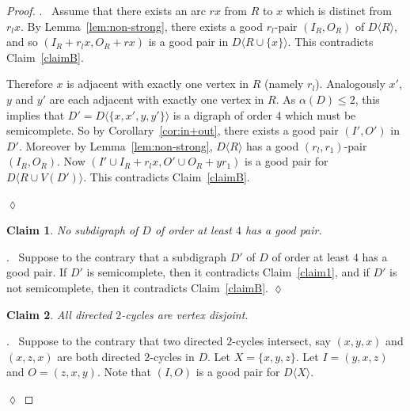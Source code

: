 \documentclass{article}
\newtheorem{claim}{Claim}[theorem]
\theoremstyle{definition}
\newcommand{\induce}[2]{#1\langle #2 \rangle}
\newcommand{\2}{\vspace{0.2cm}}
\newenvironment{subproof}{\par\noindent {\it Proof}.\ }{\hfill$\lozenge$\par\vspace{11pt}}
\begin{document}
\begin{proof}
\begin{subproof}
Assume that there exists an arc $r x$ from $R$ to $x$ which is
distinct from $r_l x$.  By Lemma~\ref{lem:non-strong}, there exists a
good $r_l$-pair $(I_R,O_R)$ of $\induce{D}{R}$, and so $(I_R+r_lx,
O_R+rx)$ is a good pair in $\induce{D}{R \cup \{x\}}$. This
contradicts Claim~\ref{claimB}.

Therefore $x$ is adjacent with exactly one vertex in $R$ (namely
$r_l$).  Analogously $x'$, $y$ and $y'$ are each adjacent with exactly
one vertex in $R$.  As $\alpha(D)\leq 2$, this implies that $D' = \induce{D}{\{x,x',y,y'\}}$
is a digraph of order $4$ which must be  semicomplete. So by
  Corollary~\ref{cor:in+out}, there exists a good pair $(I',O')$ in
  $D'$. Moreover by Lemma~\ref{lem:non-strong}, $\induce{D}{R}$ has a
  good $(r_l,r_1)$-pair $(I_R,O_R)$.  Now $(I'
  \cup I_R+ r_l x, O' \cup O_R + y r_1)$ is a
  good pair for $\induce{D}{R \cup V(D')}$. This contradicts
  Claim~\ref{claimB}.
%



\end{subproof}


\begin{claim}\label{claimC}
No subdigraph of $D$ of order at least $4$ has a good pair.
\end{claim}
\begin{subproof}
Suppose to the contrary that a subdigraph $D'$ of $D$ of order at
least $4$ has a good pair.  If $D'$ is semicomplete, then it
contradicts Claim~\ref{claim1}, and if $D'$ is not semicomplete, then
it contradicts Claim~\ref{claimB}.
\end{subproof}


\begin{claim}\label{claim2}
All directed $2$-cycles are vertex disjoint.
\end{claim}
\begin{subproof}
Suppose to the contrary that two directed $2$-cycles intersect, say
$(x,y,x)$ and $(x,z,x)$ are both directed $2$-cycles in $D$. Let $X = \{x,y,z\}$.  Let
$I=(y,x,z)$ and $O=(z,x,y)$.  Note that $(I,O)$ is a good pair for
$\induce{D}{X}$.


\end{subproof}
\end{proof}
\end{document}
